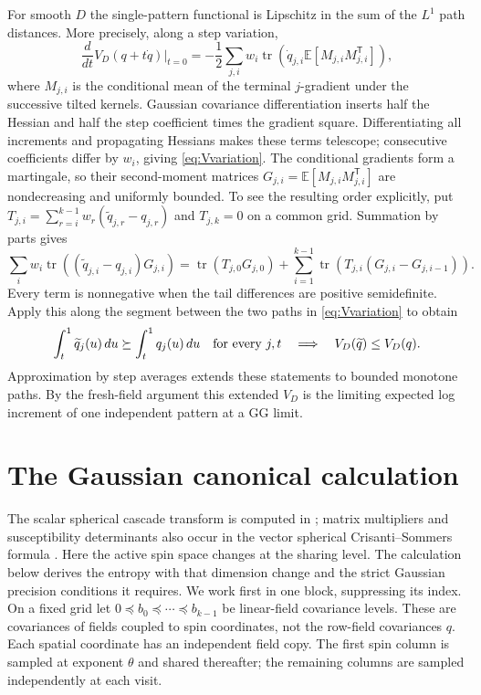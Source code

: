 \documentclass[11pt]{article}
\numberwithin{equation}{section}
\theoremstyle{definition}
\newcommand{\E}{\mathbb E}
\newcommand{\tr}{\operatorname{tr}}
\begin{document}
For smooth $D$ the single-pattern functional is Lipschitz in the sum of the $L^1$ path distances. More precisely, along a step variation,
\begin{equation}\label{eq:Vvariation}
\frac{d}{dt}V_D(q+t\dot q)\Big|_{t=0}
=-\frac12\sum_{j,i}w_i\tr\left(\dot q_{j,i}\E[M_{j,i}M_{j,i}^{\mathsf T}]\right),
\end{equation}
where $M_{j,i}$ is the conditional mean of the terminal $j$-gradient under the successive tilted kernels. Gaussian covariance differentiation inserts half the Hessian and half the step coefficient times the gradient square. Differentiating all increments and propagating Hessians makes these terms telescope; consecutive coefficients differ by $w_i$, giving \eqref{eq:Vvariation}. The conditional gradients form a martingale, so their second-moment matrices $G_{j,i}=\E[M_{j,i}M_{j,i}^{\mathsf T}]$ are nondecreasing and uniformly bounded. To see the resulting order explicitly, put
$T_{j,i}=\sum_{r=i}^{k-1}w_r(\widetilde q_{j,r}-q_{j,r})$ and $T_{j,k}=0$ on a common grid. Summation by parts gives
\[
\sum_iw_i\tr((\widetilde q_{j,i}-q_{j,i})G_{j,i})
=\tr(T_{j,0}G_{j,0})+
\sum_{i=1}^{k-1}\tr(T_{j,i}(G_{j,i}-G_{j,i-1})).
\]
Every term is nonnegative when the tail differences are positive semidefinite. Apply this along the segment between the two paths in \eqref{eq:Vvariation} to obtain
\begin{equation}\label{eq:Vorder}
\int_t^1\widetilde q_j(u)\,du\succeq\int_t^1q_j(u)\,du\quad\hbox{for every }j,t
\quad\Longrightarrow\quad V_D(\widetilde q)\le V_D(q).
\end{equation}
Approximation by step averages extends these statements to bounded monotone paths. By the fresh-field argument this extended $V_D$ is the limiting expected log increment of one independent pattern at a GG limit.

\section{The Gaussian canonical calculation}
\label{sec:canonical}
The scalar spherical cascade transform is computed in \cite[Proposition~3.1]{Mourrat2022}; matrix multipliers and susceptibility determinants also occur in the vector spherical Crisanti--Sommers formula \cite{Ko2019}. Here the active spin space changes at the sharing level. The calculation below derives the entropy with that dimension change and the strict Gaussian precision conditions it requires.
We work first in one block, suppressing its index. On a fixed grid let
$0\preceq b_0\preceq\cdots\preceq b_{k-1}$ be linear-field covariance levels. These are covariances of fields coupled to spin coordinates, not the row-field covariances $q$. Each spatial coordinate has an independent field copy. The first spin column is sampled at exponent $\theta$ and shared thereafter; the remaining columns are sampled independently at each visit.
\end{document}
